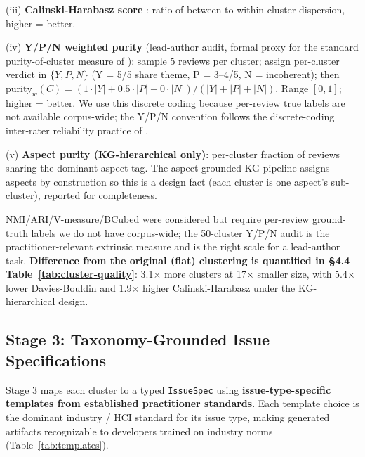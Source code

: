 \documentclass[sigconf, nonacm, anonymous, balance=false]{acmart}
\begin{document}
(iii) \textbf{Calinski-Harabasz score} \cite{calinski1974dendrite}: ratio of between-to-within cluster dispersion, higher = better.

(iv) \textbf{Y/P/N weighted purity} (lead-author audit, formal proxy for the standard purity-of-cluster measure of \cite{manning2008introduction, landis1977}): sample 5 reviews per cluster; assign per-cluster verdict in $\{Y, P, N\}$ (Y = 5/5 share theme, P = 3--4/5, N = incoherent); then $\mathrm{purity}_w(C) = (1\cdot|Y| + 0.5\cdot|P| + 0\cdot|N|) / (|Y|+|P|+|N|)$. Range $[0, 1]$; higher = better. We use this discrete coding because per-review true labels are not available corpus-wide; the Y/P/N convention follows the discrete-coding inter-rater reliability practice of \cite{landis1977}.

(v) \textbf{Aspect purity (KG-hierarchical only)}: per-cluster fraction of reviews sharing the dominant aspect tag. The aspect-grounded KG pipeline assigns aspects by construction so this is a design fact (each cluster is one aspect's sub-cluster), reported for completeness.

NMI/ARI/V-measure/BCubed \cite{strehl2002cluster, amigo2009comparison} were considered but require per-review ground-truth labels we do not have corpus-wide; the 50-cluster Y/P/N audit is the practitioner-relevant extrinsic measure and is the right scale for a lead-author task. \textbf{Difference from the original (flat) clustering is quantified in §4.4 Table~\ref{tab:cluster-quality}}: 3.1$\times$ more clusters at 17$\times$ smaller size, with 5.4$\times$ lower Davies-Bouldin and 1.9$\times$ higher Calinski-Harabasz under the KG-hierarchical design.

\subsection{Stage 3: Taxonomy-Grounded Issue Specifications}\label{stage-3-taxonomy-grounded-issue-specifications}

Stage 3 maps each cluster to a typed \texttt{IssueSpec} using \textbf{issue-type-specific templates from established practitioner standards}. Each template choice is the dominant industry / HCI standard for its issue type, making generated artifacts recognizable to developers trained on industry norms (Table~\ref{tab:templates}).
\end{document}
